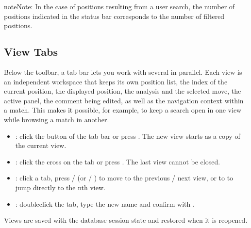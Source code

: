 \documentclass[letterpaper,10pt,english]{sphinxmanual}
\begin{document}
\begin{sphinxadmonition}{note}{Note:}
\sphinxAtStartPar
In the case of positions resulting from a user search, the number of positions indicated in the status bar corresponds to the number of filtered positions.
\end{sphinxadmonition}


\subsection{View Tabs}
\label{\detokenize{manuel:onglets-de-vues}}\label{\detokenize{manuel:onglets-vues}}
\sphinxAtStartPar
Below the toolbar, a tab bar lets you work with several  in parallel. Each view is an independent workspace that keeps its own position list, the index of the current position, the displayed position, the analysis and the selected move, the active panel, the comment being edited, as well as the navigation context within a match. This makes it possible, for example, to keep a search open in one view while browsing a match in another.
\begin{itemize}
\item {} 
\sphinxAtStartPar
{}: click the \sphinxstyleemphasis{+} button of the tab bar or press . The new view starts as a copy of the current view.

\item {} 
\sphinxAtStartPar
{}: click the cross on the tab or press . The last view cannot be closed.

\item {} 
\sphinxAtStartPar
{}: click a tab, press  /  (or  / ) to move to the previous / next view, or  to  to jump directly to the n\sphinxhyphen{}th view.

\item {} 
\sphinxAtStartPar
{}: double\sphinxhyphen{}click the tab, type the new name and confirm with .

\end{itemize}

\sphinxAtStartPar
Views are saved with the database session state and restored when it is reopened.
\end{document}
